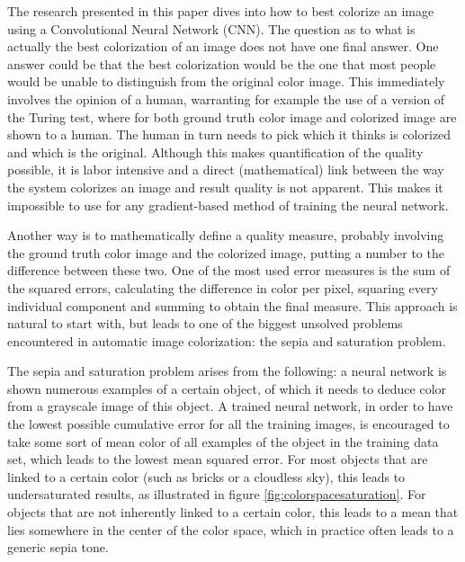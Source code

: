 The research presented in this paper dives into how to best colorize an image using a Convolutional Neural Network (CNN). The question as to what is actually the best colorization of an image does not have one final answer. 
One answer could be that the best colorization would be the one that most people would be unable to distinguish from the original color image. This immediately involves the opinion of a human, warranting for example the use of a version of the Turing test, where for both ground truth color image and colorized image are shown to a human. The human in turn needs to pick which it thinks is colorized and which is the original. 
Although this makes quantification of the quality possible, it is labor intensive and a direct (mathematical) link between the way the system colorizes an image and result quality is not apparent. This makes it impossible to use for any gradient-based method of training the neural network. 

Another way is to mathematically define a quality measure, probably involving the ground truth color image and the colorized image, putting a number to the difference between these two. 
One of the most used error measures is the sum of the squared errors, calculating the difference in color per pixel, squaring every individual component and summing to obtain the final measure. 
This approach is natural to start with, but leads to one of the biggest unsolved problems encountered in automatic image colorization: the sepia and saturation problem.

The sepia and saturation problem arises from the following: a neural network is shown numerous examples of a certain object, of which it needs to deduce color from a grayscale image of this object. 
A trained neural network, in order to have the lowest possible cumulative error for all the training images, is encouraged to take some sort of mean color of all examples of the object in the training data set, which leads to the lowest mean squared error. For most objects that are linked to a certain color (such as bricks or a cloudless sky), this leads to undersaturated results, as illustrated in figure \ref{fig:colorspacesaturation}. 
For objects that are not inherently linked to a certain color, this leads to a mean that lies somewhere in the center of the color space, which in practice often leads to a generic sepia tone.\\

